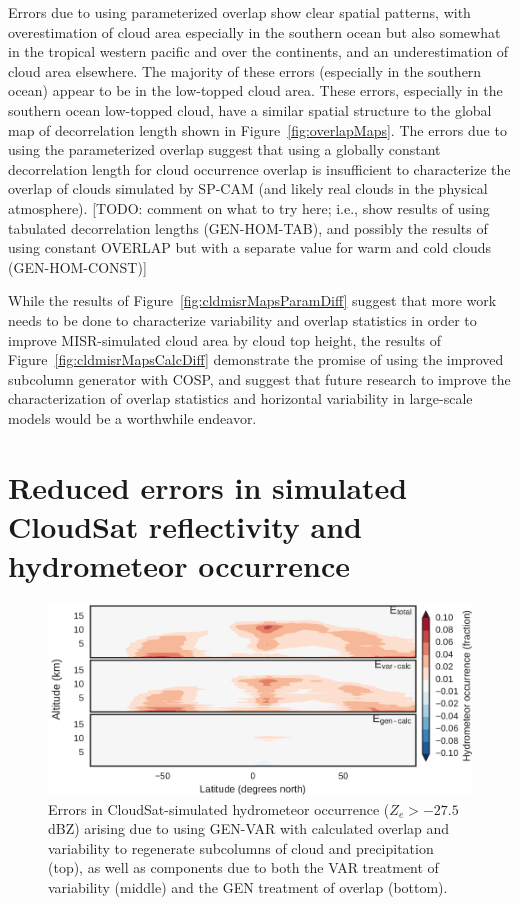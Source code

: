 Errors due to using parameterized overlap show clear spatial patterns,
with overestimation of cloud area especially in the southern ocean but
also somewhat in the tropical western pacific and over the continents,
and an underestimation of cloud area elsewhere. The majority of these
errors (especially in the southern ocean) appear to be in the low-topped
cloud area. These errors, especially in the southern ocean low-topped
cloud, have a similar spatial structure to the global map of
decorrelation length shown in Figure~\ref{fig:overlapMaps}. The errors
due to using the parameterized overlap suggest that using a globally
constant decorrelation length for cloud occurrence overlap is
insufficient to characterize the overlap of clouds simulated by SP-CAM
(and likely real clouds in the physical atmosphere). {[}TODO: comment on
what to try here; i.e., show results of using tabulated decorrelation
lengths (GEN-HOM-TAB), and possibly the results of using constant
OVERLAP but with a separate value for warm and cold clouds
(GEN-HOM-CONST){]}

While the results of Figure~\ref{fig:cldmisrMapsParamDiff} suggest that
more work needs to be done to characterize variability and overlap
statistics in order to improve MISR-simulated cloud area by cloud top
height, the results of Figure~\ref{fig:cldmisrMapsCalcDiff} demonstrate
the promise of using the improved subcolumn generator with COSP, and
suggest that future research to improve the characterization of overlap
statistics and horizontal variability in large-scale models would be a
worthwhile endeavor.

\section{Reduced errors in simulated CloudSat reflectivity and
hydrometeor occurrence}\label{sec:subgrid2Active}

\begin{figure}[htbp]
\centering
\includegraphics{graphics/subgrid2_hfba_zonal_gen-var-calc_diff.pdf}
\caption{\label{fig:hfbaZonalCalcDiff}Errors in CloudSat-simulated
hydrometeor occurrence (\(Z_e > -27.5\) dBZ) arising due to using
GEN-VAR with calculated overlap and variability to regenerate subcolumns
of cloud and precipitation (top), as well as components due to both the
VAR treatment of variability (middle) and the GEN treatment of overlap
(bottom).}\label{fig:hfbaZonalCalcDiff}
\end{figure}

